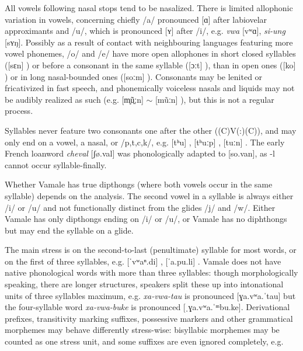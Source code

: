 All vowels following nasal stops tend to be nasalized. There is limited allophonic variation in vowels, concerning chiefly /a/ pronounced [ɑ] after labiovelar approximants and /u/, which is pronounced [ʏ] after /i/, e.g. \textit{vwa}  [vʷɑ], \textit{si-ung}  [sʏŋ]. Possibly as a result of contact with neighbouring languages featuring more vowel phonemes, /o/ and /e/ have more open allophones in short closed syllables ([sɛn] ) or before a consonant in the same syllable ([ɔːt] ), than in open ones ([ko] ) or in long nasal-bounded ones ([soːm] ). Consonants may be lenited or fricativized in fast speech, and phonemically voiceless nasals and liquids may not be audibly realized as such (e.g. [m̥ũ̠ːn] $\sim$ [mũːn] ), but this is not a regular process.

Syllables never feature two consonants one after the other ((C)V(:)(C)), and may only end on a vowel, a nasal, or /p,t,c,k/, e.g. [tʰu] , [tʰuːp] , [tuːn] . The early French loanword \textit{cheval} [ʃø.val]  was phonologically adapted to [so.van], as -l cannot occur syllable-finally.

Whether Vamale has true dipthongs (where both vowels occur in the same syllable) depends on the analysis. The second vowel in a syllable is always either /i/ or /u/ and not functionally distinct from the glides /j/ and /w/. Either Vamale has only dipthongs ending on /i/ or /u/, or Vamale has no diphthongs but may end the syllable on a glide. 

\begin{sloppypar}
The main stress is on the second-to-last (penultimate) syllable for most words, or on the first of three syllables, e.g. [ˈvʷaⁿ.di] , [ˈa.pu.li] . Vamale does not have native phonological words with more than three syllables: though morphologically speaking, there are longer structures, speakers split these up into intonational units of three syllables maximum, e.g. \textit{xa-vwa-tau}  is pronounced [ɣa.vʷa.ˈtau] but the four-syllable word \textit{xa-vwa-buke}  is pronounced [ˌɣa.vʷa.ˈᵐbu.ke].
Derivational prefixes, transitivity marking suffixes, possessive markers and other grammatical morphemes may behave differently stress-wise: bisyllabic morphemes may be counted as one stress unit, and some suffixes are even ignored completely, e.g.
\end{sloppypar}

